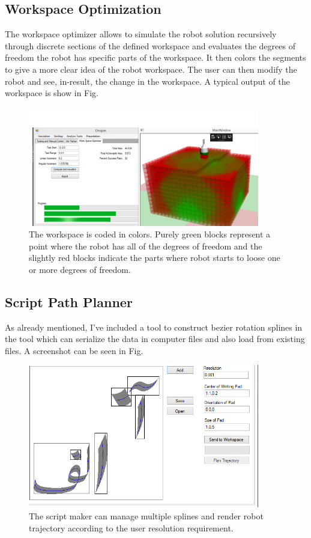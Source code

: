 {    \subsection{Workspace Optimization}
    The workspace optimizer allows to simulate the robot solution recursively through discrete sections of the defined workspace and evaluates the degrees of freedom the robot has  specific parts of the workspace. It then colors the segments to give a more clear idea of the robot workspace. The user can then modify the robot and see, in-result, the change in the workspace. A typical output of the workspace is show in Fig.

        \begin{figure}
          \centering
          \includegraphics[width=0.9\textwidth]{WorkSpaceOptimer.png}
          \caption{The workspace is coded in colors. Purely green blocks represent a point where the robot has all of the degrees of freedom and the slightly red blocks indicate the parts where robot starts to loose one or more degrees of freedom.
          } \label{FigWorkspace}
        \end{figure}
    \subsection{Script Path Planner}
    As already mentioned, I've included a tool to construct bezier rotation splines in the tool which can serialize the data in computer files and also load from existing files. A screenshot can be seen in Fig.

        \begin{figure}
          \centering
          \includegraphics[width=0.9\textwidth]{SctiptEditor.png}
          \caption{The script maker can manage multiple splines and render robot trajectory according to the user resolution requirement.
          } \label{FigWorkspace}
        \end{figure}
}
